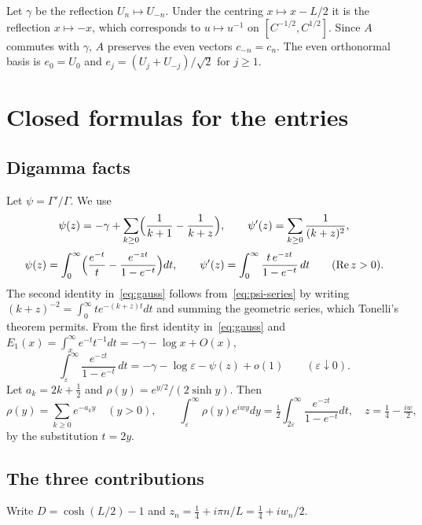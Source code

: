 \documentclass[11pt,a4paper]{article}
\theoremstyle{definition}
\newcommand{\eps}{\varepsilon}
\DeclareMathOperator{\Rea}{Re}
\begin{document}
Let $\gamma$ be the reflection $U_n\mapsto U_{-n}$. Under the centring
$x\mapsto x-L/2$ it is the reflection $x\mapsto-x$, which corresponds to
$u\mapsto u^{-1}$ on $[C^{-1/2},C^{1/2}]$. Since $A$ commutes with $\gamma$,
$A$ preserves the even vectors $c_{-n}=c_n$. The even orthonormal basis is
$e_0=U_0$ and $e_j=(U_j+U_{-j})/\sqrt2$ for $j\ge1$.

\section{Closed formulas for the entries}\label{sec:closed}

\subsection{Digamma facts}
Let $\psi=\Gamma'/\Gamma$. We use
\begin{equation}\label{eq:psi-series}
\psi(z)=-\gamma+\sum_{k\ge0}\Bigl(\frac1{k+1}-\frac1{k+z}\Bigr),\qquad
\psi'(z)=\sum_{k\ge0}\frac1{(k+z)^2},
\end{equation}
\begin{equation}\label{eq:gauss}
\psi(z)=\int_0^\infty\Bigl(\frac{e^{-t}}t-\frac{e^{-zt}}{1-e^{-t}}\Bigr)dt,\qquad
\psi'(z)=\int_0^\infty\frac{t\,e^{-zt}}{1-e^{-t}}\,dt\qquad(\Rea z>0).
\end{equation}
The second identity in~\eqref{eq:gauss} follows from~\eqref{eq:psi-series}
by writing $(k+z)^{-2}=\int_0^\infty te^{-(k+z)t}dt$ and summing the
geometric series, which Tonelli's theorem permits. From the first identity
in~\eqref{eq:gauss} and $E_1(x)=\int_x^\infty e^{-t}t^{-1}dt=-\gamma-\log x+O(x)$,
\begin{equation}\label{eq:reg}
\int_\eps^\infty\frac{e^{-zt}}{1-e^{-t}}\,dt=-\gamma-\log\eps-\psi(z)+o(1)\qquad(\eps\downarrow0).
\end{equation}
Let $a_k=2k+\tfrac12$ and $\rho(y)=e^{y/2}/(2\sinh y)$. Then
\begin{equation}\label{eq:rho}
\rho(y)=\sum_{k\ge0}e^{-a_ky}\quad(y>0),\qquad
\int_\eps^\infty\rho(y)e^{iwy}dy=\tfrac12\int_{2\eps}^\infty\frac{e^{-zt}}{1-e^{-t}}dt,\quad z=\tfrac14-\tfrac{iw}2,
\end{equation}
by the substitution $t=2y$.

\subsection{The three contributions}
Write $D=\cosh(L/2)-1$ and $z_n=\tfrac14+i\pi n/L=\tfrac14+iw_n/2$.
\end{document}

